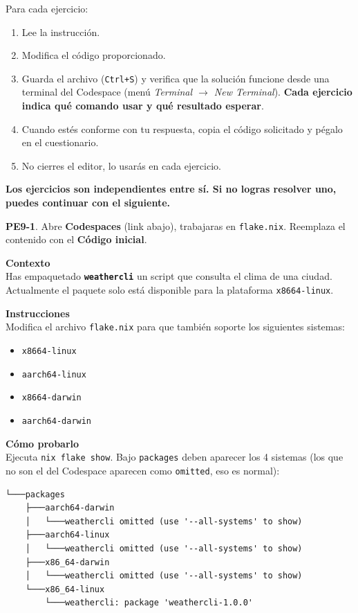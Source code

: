 Para cada ejercicio:

\begin{enumerate}
\item Lee la instrucción.
\item Modifica el código proporcionado.
\item Guarda el archivo (\texttt{Ctrl+S}) y verifica que la solución funcione desde una terminal del Codespace (menú \emph{Terminal $\rightarrow$ New Terminal}). \textbf{Cada ejercicio indica qué comando usar y qué resultado esperar}.
\item Cuando estés conforme con tu respuesta, copia el código solicitado y pégalo en el cuestionario.
\item No cierres el editor, lo usarás en cada ejercicio.
\end{enumerate}

\textbf{Los ejercicios son independientes entre sí. Si no logras resolver uno, puedes continuar con el siguiente.}

\textbf{PE9-1}. Abre \textbf{Codespaces} (link abajo), trabajaras en \texttt{flake.nix}. Reemplaza el contenido con el \textbf{Código inicial}.

\textbf{Contexto}\\
Has empaquetado \textbf{\texttt{weathercli}} un script que consulta el clima de una ciudad. Actualmente el paquete solo está disponible para la plataforma \texttt{x86\textunderscore{}64-linux}.

\textbf{Instrucciones}\\
Modifica el archivo \texttt{flake.nix} para que también soporte los siguientes sistemas:

\begin{itemize}
\item \texttt{x86\textunderscore{}64-linux}
\item \texttt{aarch64-linux}
\item \texttt{x86\textunderscore{}64-darwin}
\item \texttt{aarch64-darwin}
\end{itemize}

\textbf{Cómo probarlo}\\
Ejecuta \texttt{nix flake show}. Bajo \texttt{packages} deben aparecer los 4 sistemas (los que no son el del Codespace aparecen como \texttt{omitted}, eso es normal):

\begin{bloquecodigo}
\begin{lstlisting}
└───packages
    ├───aarch64-darwin
    │   └───weathercli omitted (use '--all-systems' to show)
    ├───aarch64-linux
    │   └───weathercli omitted (use '--all-systems' to show)
    ├───x86_64-darwin
    │   └───weathercli omitted (use '--all-systems' to show)
    └───x86_64-linux
        └───weathercli: package 'weathercli-1.0.0'
\end{lstlisting}
\end{bloquecodigo}

